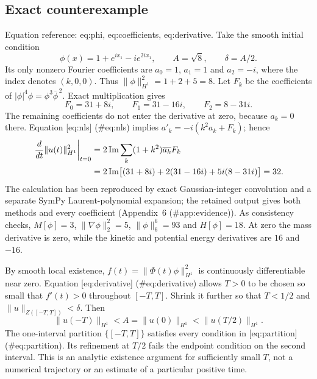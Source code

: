 \documentclass[10pt]{article}
\begin{document}
\subsection*{Exact counterexample}
Equation reference: eq:phi, eq:coefficients, eq:derivative. Take the smooth initial condition \[
 \phi(x)=1+e^{ix_1}-i e^{2ix_1},\qquad A=\sqrt8,\qquad
 \delta=A/2.\] Its only nonzero Fourier coefficients are \(a_0=1\), \(a_1=1\) and \(a_2=-i\), where the index denotes \((k,0,0)\). Thus \(\|\phi\|_{H^1}^2=1+2+5=8\). Let \(F_k\) be the coefficients of \(|\phi|^4\phi
=\phi^3\overline{\phi}^{\,2}\). Exact multiplication gives \[
 F_0=31+8i,\qquad F_1=31-16i,\qquad F_2=8-31i.\] The remaining coefficients do not enter the derivative at zero, because \(a_k=0\) there. Equation [eq:nls] (\#eq:nls) implies \(a'_k=-i(k^2a_k+F_k)\); hence \[\begin{aligned}
 \left.\frac{d}{dt}\|u(t)\|_{H^1}^2\right|_{t=0}
 &=2\operatorname{Im}\sum_k(1+k^2)\overline{a_k}F_k \notag\\
 &=2\operatorname{Im}\bigl[(31+8i)+2(31-16i)+5i(8-31i)\bigr]
 =32. \end{aligned}\] The calculation has been reproduced by exact Gaussian-integer convolution and a separate SymPy Laurent-polynomial expansion; the retained output gives both methods and every coefficient (Appendix 6 (\#app:evidence)). As consistency checks, \(M[\phi]=3\), \(\|\nabla\phi\|_2^2=5\), \(\|\phi\|_6^6=93\) and \(H[\phi]=18\). At zero the mass derivative is zero, while the kinetic and potential energy derivatives are \(16\) and \(-16\).\par
By smooth local existence, \(f(t)=\|\Phi(t)\phi\|_{H^1}^2\) is continuously differentiable near zero. Equation [eq:derivative] (\#eq:derivative) allows \(T>0\) to be chosen so small that \(f'(t)>0\) throughout \([-T,T]\). Shrink it further so that \(T<1/2\) and \(\|u\|_{Z([-T,T])}<\delta\). Then \[\|u(-T)\|_{H^1}<A=\|u(0)\|_{H^1}
       <\|u(T/2)\|_{H^1}.\] The one-interval partition \(\{[-T,T]\}\) satisfies every condition in [eq:partition] (\#eq:partition). Its refinement at \(T/2\) fails the endpoint condition on the second interval. This is an analytic existence argument for sufficiently small \(T\), not a numerical trajectory or an estimate of a particular positive time.\par
\end{document}
